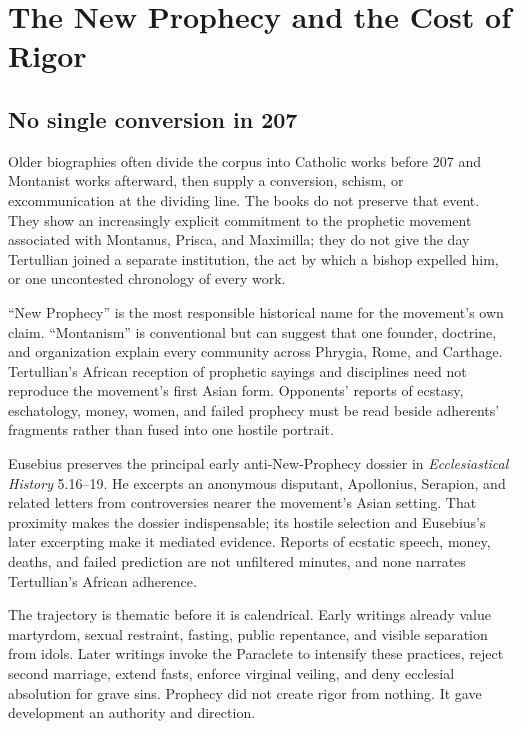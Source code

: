 \section{The New Prophecy and the Cost of Rigor}

\subsection{No single conversion in 207}

Older biographies often divide the corpus into Catholic works before 207 and
Montanist works afterward, then supply a conversion, schism, or excommunication
at the dividing line. The books do not preserve that event. They show an
increasingly explicit commitment to the prophetic movement associated with
Montanus, Prisca, and Maximilla; they do not give the day Tertullian joined a
separate institution, the act by which a bishop expelled him, or one uncontested
chronology of every work.

``New Prophecy'' is the most responsible historical name for the movement's own
claim. ``Montanism'' is conventional but can suggest that one founder, doctrine,
and organization explain every community across Phrygia, Rome, and Carthage.
Tertullian's African reception of prophetic sayings and disciplines need not
reproduce the movement's first Asian form. Opponents' reports of ecstasy,
eschatology, money, women, and failed prophecy must be read beside adherents'
fragments rather than fused into one hostile portrait.

Eusebius preserves the principal early anti-New-Prophecy dossier in
\emph{Ecclesiastical History} 5.16--19. He excerpts an anonymous disputant,
Apollonius, Serapion, and related letters from controversies nearer the
movement's Asian setting. That proximity makes the dossier indispensable; its
hostile selection and Eusebius's later excerpting make it mediated evidence.
Reports of ecstatic speech, money, deaths, and failed prediction are not
unfiltered minutes, and none narrates Tertullian's African adherence.

The trajectory is thematic before it is calendrical. Early writings already
value martyrdom, sexual restraint, fasting, public repentance, and visible
separation from idols. Later writings invoke the Paraclete to intensify these
practices, reject second marriage, extend fasts, enforce virginal veiling, and
deny ecclesial absolution for grave sins. Prophecy did not create rigor from
nothing. It gave development an authority and direction.

